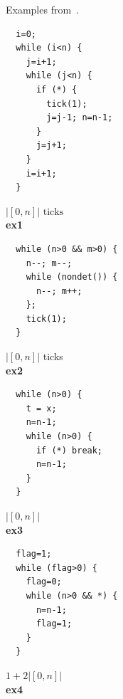 \documentclass{sigplanconf}
\begin{document}
{\begin{figure}
   \caption{Examples from~\cite{GulwaniJK09}.}
  \label{fig:cat2c}
\end{figure}


\begin{figure}
 \setlength{\progwidth}{.24\linewidth}
  \centering
%
%
  \begin{minipage}[b]{\progwidth}
    \begin{center}
   \begin{lstlisting}
  i=0;
  while (i<n) {
    j=i+1;
    while (j<n) {
      if (*) {
        tick(1);
        j=j-1; n=n-1;
      }
      j=j+1;
    }
    i=i+1;
  }
   \end{lstlisting}
$|[0, n]| \text{ ticks}$
\\[.7\baselineskip]
      {\bf ex1}
    \end{center}
  \end{minipage}
%
%
  \begin{minipage}[b]{\progwidth}
    \begin{center}
   \begin{lstlisting}
  while (n>0 && m>0) {
    n--; m--;
    while (nondet()) {
      n--; m++;
    };
    tick(1);
  }
   \end{lstlisting}
$|[0,n]|$ ticks
\\[.7\baselineskip]
      {\bf ex2}
    \end{center}
  \end{minipage}
%
%
  \begin{minipage}[b]{\progwidth}
    \begin{center}
   \begin{lstlisting}
  while (n>0) {
    t = x;
    n=n-1;
    while (n>0) {
      if (*) break;
      n=n-1;
    }
  }
   \end{lstlisting}
$|[0, n]|$
\\[.7\baselineskip]
      {\bf ex3}
    \end{center}
  \end{minipage}
%
%
  \begin{minipage}[b]{\progwidth}
    \begin{center}
   \begin{lstlisting}
  flag=1;
  while (flag>0) {
    flag=0;
    while (n>0 && *) {
      n=n-1;
      flag=1;
    }
  }
   \end{lstlisting}
$1 + 2|[0, n]|$
\\[.7\baselineskip]
      {\bf ex4}
    \end{center}
  \end{minipage}



\end{figure}}
\end{document}
